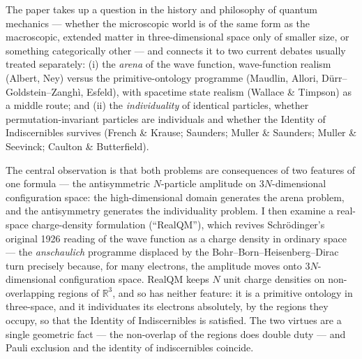 \documentclass[11pt]{article}
\begin{document}
\medskip
\noindent The paper takes up a question in the history and philosophy of quantum mechanics --- whether the
microscopic world is of the same form as the macroscopic, extended matter in three-dimensional space only
of smaller size, or something categorically other --- and connects it to two current debates usually
treated separately: (i) the \emph{arena} of the wave function, wave-function realism (Albert, Ney) versus
the primitive-ontology programme (Maudlin, Allori, D\"urr--Goldstein--Zangh\`i, Esfeld), with spacetime
state realism (Wallace \& Timpson) as a middle route; and (ii) the \emph{individuality} of identical
particles, whether permutation-invariant particles are individuals and whether the Identity of
Indiscernibles survives (French \& Krause; Saunders; Muller \& Saunders; Muller \& Seevinck; Caulton \&
Butterfield).

\medskip
\noindent The central observation is that both problems are consequences of two features of one formula ---
the antisymmetric $N$-particle amplitude on $3N$-dimensional configuration space: the high-dimensional
domain generates the arena problem, and the antisymmetry generates the individuality problem. I then
examine a real-space charge-density formulation (``RealQM''), which revives Schr\"odinger's original 1926
reading of the wave function as a charge density in ordinary space --- the \emph{anschaulich} programme
displaced by the Bohr--Born--Heisenberg--Dirac turn precisely because, for many electrons, the amplitude
moves onto $3N$-dimensional configuration space. RealQM keeps $N$ unit charge densities on non-overlapping
regions of $\mathbb{R}^3$, and so has neither feature: it is a primitive ontology in three-space, and it
individuates its electrons absolutely, by the regions they occupy, so that the Identity of Indiscernibles
is satisfied. The two virtues are a single geometric fact --- the non-overlap of the regions does double
duty --- and Pauli exclusion and the identity of indiscernibles coincide.
\end{document}
